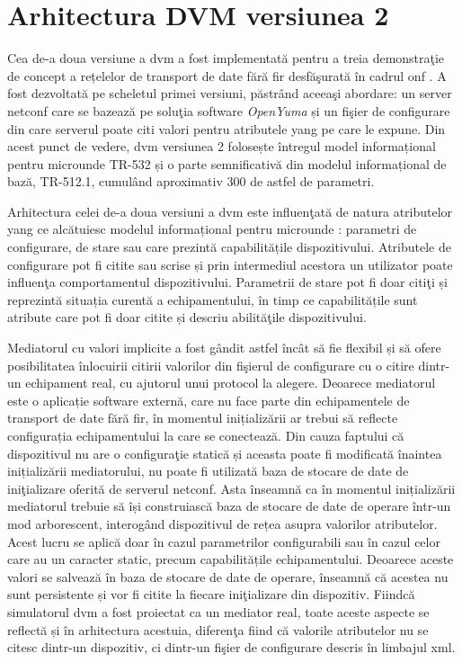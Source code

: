 \section{Arhitectura DVM versiunea 2}

Cea de-a doua versiune a \gls{dvm} a fost implementată pentru a treia demonstraţie de concept a rețelelor de transport de date fără fir desfăşurată în cadrul \gls{onf} \cite{onf2016_poc3}. A fost dezvoltată pe scheletul primei versiuni, păstrând aceeaşi abordare: un server \gls{netconf} care se bazează pe soluţia software \textit{OpenYuma} și un fişier de configurare din care serverul poate citi valori pentru atributele \gls{yang} pe care le expune. Din acest punct de vedere, \gls{dvm} versiunea 2 folosește întregul model informațional pentru microunde TR-532 și o parte semnificativă din modelul informațional de bază, TR-512.1, cumulând aproximativ 300 de astfel de parametri.

Arhitectura celei de-a doua versiuni a \gls{dvm} este influenţată de natura atributelor \gls{yang} ce alcătuiesc modelul informațional pentru microunde \cite{stancu2017enabling}: parametri de configurare, de stare sau care prezintă capabilitățile dispozitivului. Atributele de configurare pot fi citite sau scrise și prin intermediul acestora un utilizator poate influenţa comportamentul dispozitivului. Parametrii de stare pot fi doar citiţi și reprezintă situația curentă a echipamentului, în timp ce capabilitățile sunt atribute care pot fi doar citite și descriu abilităţile dispozitivului.

Mediatorul cu valori implicite a fost gândit astfel încât să fie flexibil și să ofere posibilitatea înlocuirii citirii valorilor din fişierul de configurare cu o citire dintr-un echipament real, cu ajutorul unui protocol la alegere. Deoarece mediatorul este o aplicație software externă, care nu face parte din echipamentele de transport de date fără fir, în momentul inițializării ar trebui să reflecte configurația echipamentului la care se conectează. Din cauza faptului că dispozitivul nu are o configuraţie statică și aceasta poate fi modificată înaintea inițializării mediatorului, nu poate fi utilizată baza de stocare de date de iniţializare oferită de serverul \gls{netconf}. Asta înseamnă ca în momentul inițializării mediatorul trebuie să își construiască baza de stocare de date de operare într-un mod arborescent, interogând dispozitivul de rețea asupra valorilor atributelor. Acest lucru se aplică doar în cazul parametrilor configurabili sau în cazul celor care au un caracter static, precum capabilitățile echipamentului. Deoarece aceste valori se salvează în baza de stocare de date de operare, înseamnă că acestea nu sunt persistente și vor fi citite la fiecare iniţializare din dispozitiv. Fiindcă simulatorul \gls{dvm} a fost proiectat ca un mediator real, toate aceste aspecte se reflectă și în arhitectura acestuia, diferenţa fiind că valorile atributelor nu se citesc dintr-un dispozitiv, ci dintr-un fişier de configurare descris în limbajul \gls{xml}.


